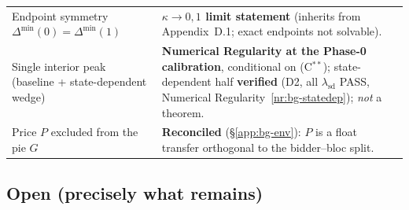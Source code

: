 \begin{center}
\begin{tabular}{@{}p{}p{}@{}}
Endpoint symmetry $\Delta^{\min}(0)=\Delta^{\min}(1)$
  & \textbf{$\kappa\to0,1$ limit statement} (inherits from Appendix~D.1;
    exact endpoints not solvable). \\
Single interior peak (baseline + state-dependent wedge)
  & \textbf{Numerical Regularity at the Phase-0 calibration}, conditional on
    (C$^{\ast\ast}$); state-dependent half \textbf{verified} (D2, all
    $\lambda_{\mathrm{sd}}$ PASS, Numerical Regularity~\ref{nr:bg-statedep});
    \emph{not} a theorem. \\
Price $P$ excluded from the pie $G$
  & \textbf{Reconciled} (\S\ref{app:bg-env}): $P$ is a float transfer orthogonal
    to the bidder--bloc split. \\
\hline
\end{tabular}
\end{center}

\subsection*{Open (precisely what remains)}
\label{app:bg-open}

